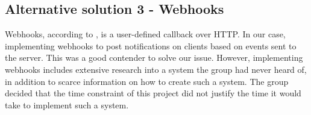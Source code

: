 \subsection{Alternative solution 3 - Webhooks}
Webhooks, according to \cite{webhooks}, is a user-defined callback over HTTP. In our case, implementing webhooks to post notifications on clients based on events sent to the server. This was a good contender to solve our issue. However, implementing webhooks includes extensive research into a system the group had never heard of, in addition to scarce information on how to create such a system. The group decided that the time constraint of this project did not justify the time it would take to implement such a system.

